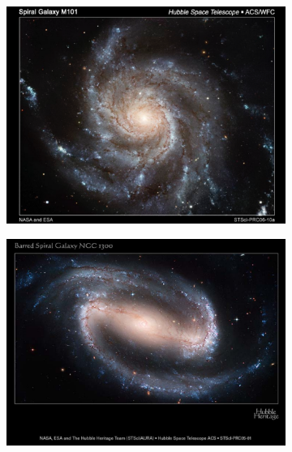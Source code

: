 \begin{figure}
	\centering
		\begin{subfigure}[b]{0.49\textwidth}
			\includegraphics[width=1\linewidth]{img/ch-01/spiralM101.png}
			\caption{}
			\label{fig:spiralM101}
		\end{subfigure}
		\begin{subfigure}[b]{0.49\textwidth}
			\includegraphics[width=1\linewidth]{img/ch-01/barredspiralNGC1300.png}
			\caption{}
			\label{fig:barredspiralNGC1300}
		\end{subfigure}
		\begin{subfigure}[b]{0.49\textwidth}

\end{subfigure}
\end{figure}

